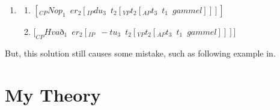 \documentclass{ctexart}
\begin{document}
\begin{enumerate}[resume]
    \item \label{Icelandic_example_LE}
    
    \begin{enumerate}
        \item $[_{CP}Nop_1 \enspace er_2[_{IP}du_3 \enspace t_2[_{VP} t_2[_{AP} t_3 \enspace t_1 \enspace gammel]]]]$
        
        \item $[_{CP}Hva$ð$_1 \enspace er_2[_{IP} \enspace -tu_3 \enspace t_2 [_{VP}t_2[_{AP}t_3 \enspace t_1 \enspace gammel]]]]$
        
    \end{enumerate}   
    
\end{enumerate}

But, this solution still causes some mistake, such as following example in.




\section{My Theory}

\newpage

\printbibliography
\end{document}
